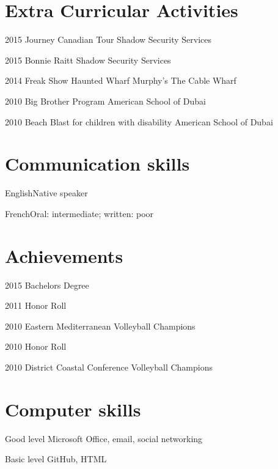 \documentclass{tccv}
\begin{document}
\section{Extra Curricular Activities}

\begin{yearlist}

\item{2015}
     {Journey Canadian Tour}
     {Shadow Security Services}

\item{2015}
     {Bonnie Raitt}
     {Shadow Security Services}

\item{2014}
     {Freak Show Haunted Wharf}
     {Murphy's The Cable Wharf}

\item{2010}
     {Big Brother Program}
     {American School of Dubai}

\item{2010}
     {Beach Blast for children with disability}
     {American School of Dubai}

\end{yearlist}

\section{Communication skills}

\begin{factlist}
\item{English}{Native speaker}
\item{French}{Oral: intermediate; written: poor}
\end{factlist}

\section{Achievements}

\begin{yearlist}

\item{2015}
     {Bachelors Degree}
     {}

\item{2011}
     {Honor Roll}
     {}

\item{2010}
     {Eastern Mediterranean Volleyball Champions}
     {}

\item{2010}
     {Honor Roll}
     {}

\item{2010}
     {District Coastal Conference Volleyball Champions}
     {}

\end{yearlist}

\vspace{-6pt} %
\section{Computer skills}

\begin{factlist}

\item{Good level}
     {Microsoft Office, email, social networking}

\item{Basic level}
     {GitHub, HTML}

\end{factlist}
\end{document}
